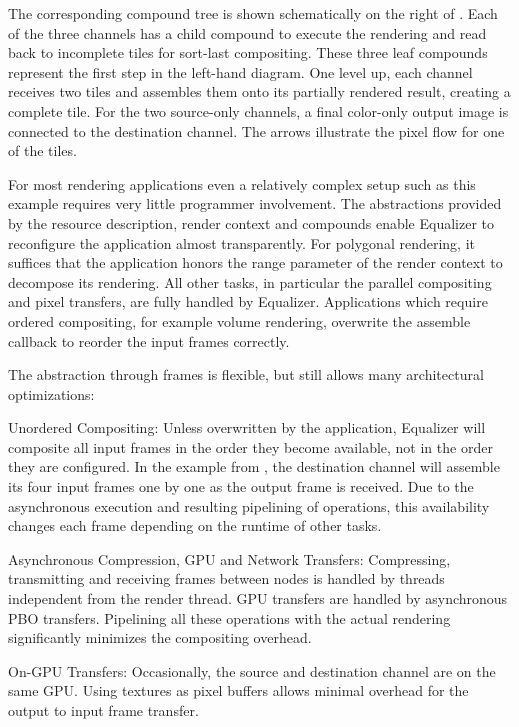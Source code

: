 The corresponding compound tree is shown schematically on the right of
. Each of the three channels has a child compound to execute
the rendering and read back to incomplete tiles for sort-last compositing. These
three leaf compounds represent the first step in the left-hand diagram. One
level up, each channel receives two tiles and assembles them onto its partially
rendered result, creating a complete tile. For the two source-only channels, a
final color-only output image is connected to the destination channel. The
arrows illustrate the pixel flow for one of the tiles.

For most rendering applications even a relatively complex setup such as this
example requires very little programmer involvement. The abstractions provided
by the resource description, render context and compounds enable Equalizer to
reconfigure the application almost transparently. For polygonal rendering, it
suffices that the application honors the \textsf{range} parameter of the render
context to decompose its rendering. All other tasks, in particular the parallel
compositing and pixel transfers, are fully handled by Equalizer. Applications
which require ordered compositing, for example volume rendering, overwrite the
assemble callback to reorder the input frames correctly.

The abstraction through frames is flexible, but still allows many architectural
optimizations:
\begin{compactdesc}
\item[Unordered Compositing:] Unless overwritten by the application, Equalizer
will composite all input frames in the order they become available, not in the
order they are configured. In the example from , the
destination channel will assemble its four input frames one by one as the output
frame is received. Due to the asynchronous execution and resulting pipelining of
operations, this availability changes each frame depending on the runtime of
other tasks.
\item[Asynchronous Compression, GPU and Network Transfers:] Compressing,
transmitting and receiving frames between nodes is handled by threads
independent from the render thread. GPU transfers are handled by asynchronous
PBO transfers. Pipelining all these operations with the actual rendering
significantly minimizes the compositing overhead.
\item[On-GPU Transfers:] Occasionally, the source and destination channel are on
the same GPU. Using textures as pixel buffers allows minimal overhead for the
output to input frame transfer.
\end{compactdesc}


